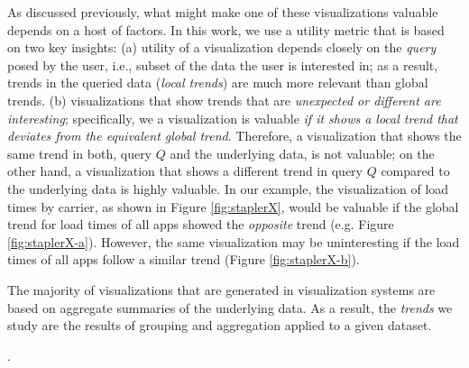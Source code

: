As discussed previously, what might make one of these visualizations valuable depends on a host of factors.
In this work, we use a utility metric that is based on two key insights:
(a) utility of a visualization depends closely on the {\it query} posed by the user, i.e., subset of the data
the user is interested in; as a result, trends in the queried data ({\it local trends}) are much more relevant 
than global trends.
(b) visualizations that show trends that are {\it unexpected or different are interesting}; specifically, we a 
visualization is valuable {\em if it shows a local trend that deviates from the equivalent global trend}.
Therefore, a visualization that shows the same trend in both, query $Q$ and the underlying data, is not valuable;
on the other hand, a visualization that shows a different trend in query $Q$ compared to the underlying data 
is highly valuable.
In our example, the visualization of load times by carrier, as shown in Figure
\ref{fig:staplerX}, would be valuable if the global trend for load times of all
apps showed the {\it opposite} trend (e.g. Figure \ref{fig:staplerX-a}).
However, the same visualization may be uninteresting if the load times of all apps
follow a similar trend (Figure \ref{fig:staplerX-b}).

The majority of visualizations that are generated in visualization systems are based on aggregate summaries of the
underlying data.
As a result, the {\it trends} we study are the results of grouping and aggregation applied to a given dataset.



.

